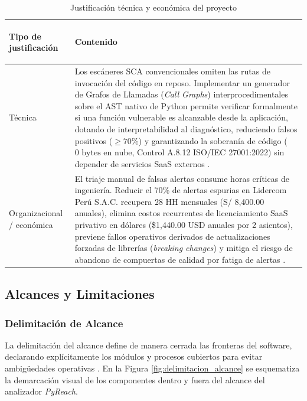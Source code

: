 \begin{table}[H]
\centering
\caption{Justificación técnica y económica del proyecto}
\label{tab:justificacion}
\small
{}
\begin{tabularx}{\textwidth}{>{\bfseries\raggedright\arraybackslash}p{4.2cm} X}
\toprule
\textbf{Tipo de justificación} & \textbf{Contenido} \\
\midrule
Técnica & 
Los escáneres SCA convencionales omiten las rutas de invocación del código en reposo. Implementar un generador de Grafos de Llamadas (\textit{Call Graphs}) interprocedimentales sobre el AST nativo de Python permite verificar formalmente si una función vulnerable es alcanzable desde la aplicación, dotando de interpretabilidad al diagnóstico, reduciendo falsos positivos ($\ge 70\%$) y garantizando la soberanía de código ($0\text{ bytes}$ en nube, Control A.8.12 ISO/IEC 27001:2022) sin depender de servicios SaaS externos \parencite{salis2021pycg, ladisa2023sok, gutierrez2024auditoria}. \\ %
\addlinespace
Organizacional / económica & 
El triaje manual de falsas alertas consume horas críticas de ingeniería. Reducir el 70\% de alertas espurias en Lidercom Perú S.A.C. recupera 28 HH mensuales (S/ 8,400.00 anuales), elimina costos recurrentes de licenciamiento SaaS privativo en dólares (\$1,440.00 USD anuales por 2 asientos), previene fallos operativos derivados de actualizaciones forzadas de librerías (\textit{breaking changes}) y mitiga el riesgo de abandono de compuertas de calidad por fatiga de alertas \parencite{pashchenko2022vuln4real, bogart2016break, sadowski2018lessons}. \\ %
\bottomrule
\end{tabularx}
\end{table}

\subsection{Alcances y Limitaciones}

\subsubsection{Delimitación de Alcance}
La delimitación del alcance define de manera cerrada las fronteras del software, declarando explícitamente los módulos y procesos cubiertos para evitar ambigüedades operativas \parencite{wiegers2013software, torres2026proyecto}. %
En la Figura \ref{fig:delimitacion_alcance} se esquematiza la demarcación visual de los componentes dentro y fuera del alcance del analizador \textit{PyReach}. %

